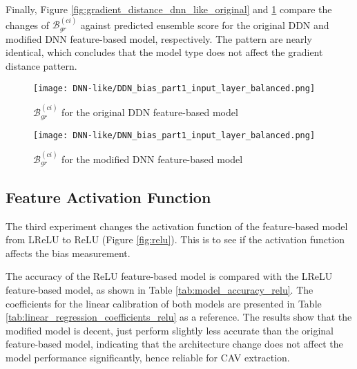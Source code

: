Finally, Figure \ref{fig:gradient_distance_dnn_like_original} and \ref{fig:gradient_distance_dnn_like_modified} compare the changes of $\mathcal{B}^{(ci)}_{gr}$ against predicted ensemble score for the original DDN and modified DNN feature-based model, respectively. The pattern are nearly identical, which concludes that the model type does not affect the gradient distance pattern.

\begin{figure}[H]
    \centering
    \begin{minipage}[t]{0.48\textwidth}
        \centering
        \texttt{[image: DNN-like/DDN\_bias\_part1\_input\_layer\_balanced.png]}
        \caption{$\mathcal{B}^{(ci)}_{gr}$ for the original DDN feature-based model}
        \label{fig:gradient_distance_dnn_like_original}
    \end{minipage}
    \hfill
    \begin{minipage}[t]{0.48\textwidth}
        \centering
        \texttt{[image: DNN-like/DNN\_bias\_part1\_input\_layer\_balanced.png]}
        \caption{$\mathcal{B}^{(ci)}_{gr}$ for the modified DNN feature-based model}
        \label{fig:gradient_distance_dnn_like_modified}
    \end{minipage}
\end{figure}

\subsection{Feature Activation Function} \label{sec:feature_activation_function}
The third experiment changes the activation function of the feature-based model from LReLU to ReLU (Figure \ref{fig:relu}). This is to see if the activation function affects the bias measurement.

The accuracy of the ReLU feature-based model is compared with the LReLU feature-based model, as shown in Table \ref{tab:model_accuracy_relu}. The coefficients for the linear calibration of both models are presented in Table \ref{tab:linear_regression_coefficients_relu} as a reference. The results show that the modified model is decent, just perform slightly less accurate than the original feature-based model, indicating that the architecture change does not affect the model performance significantly, hence reliable for CAV extraction.

